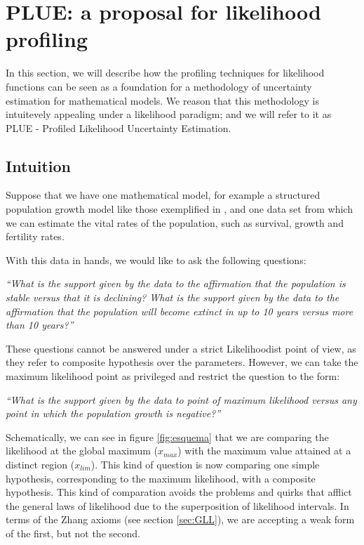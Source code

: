\documentclass[twoside,12pt,a4paper]{article}
\begin{document}
\section{PLUE: a proposal for likelihood profiling}\label{sec:plue}

In this section, we will describe how the profiling techniques for likelihood functions can be 
seen as a foundation for a methodology of uncertainty estimation for mathematical models.
We reason that this methodology is intuitevely appealing under a likelihood paradigm; and we will
refer to it as PLUE - Profiled Likelihood Uncertainty Estimation.

\subsection{Intuition}

Suppose that we have one mathematical model, for example a structured population growth model
like those exemplified in \citep{Chalom12}, and one data set from which we can estimate the 
vital rates of the population, such as survival, growth and fertility rates.

With this data in hands, we would like to ask the following questions:

{\em ``What is the support given by the data to the affirmation that the population is stable {\em versus}
that it is declining? What is the support given by the data to the affirmation that the population will
become extinct in up to 10 years {\em versus} more than 10 years?''}

These questions cannot be answered under a strict Likelihoodist point of view, as they refer to
composite hypothesis over the parameters. However, we can take the maximum likelihood point as 
privileged and restrict the question to the form:

{\em ``What is the support given by the data to point of maximum likelihood {\em versus} any point in which
the population growth is negative?''}

Schematically, we can see in figure \ref{fig:esquema} that we are comparing the likelihood at the global
maximum ($x_{max}$) with the maximum value attained at a distinct region ($x_{lim}$). This kind of question
is now comparing one simple hypothesis, corresponding to the maximum likelihood, with a composite hypothesis.
This kind of comparation avoids the problems and quirks that afflict the general laws of likelihood due to
the superposition of likelihood intervals. In terms of the Zhang axioms (see section \ref{sec:GLL}),
we are accepting a weak form of the first, but not the second.
\end{document}
